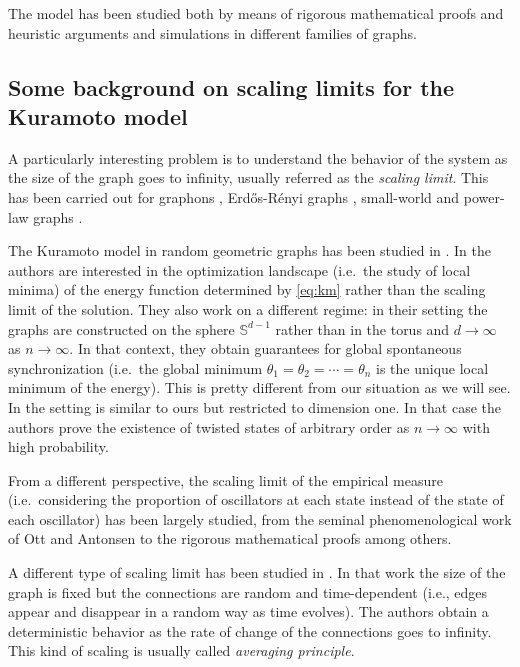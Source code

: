 \documentclass[a4paper,11pt]{amsart}
\numberwithin{equation}{section}
\numberwithin{theorem}{section}
\theoremstyle{definition}
\begin{document}
The model has been studied both by means of rigorous mathematical proofs and heuristic arguments and simulations in different families of graphs.


\subsection{Some background on scaling limits for the Kuramoto model}

A particularly interesting problem is to understand the behavior of the system as the size of the graph goes to infinity, usually referred as the {\em scaling limit}. This has been carried out for graphons \cite{medvedev2018continuum, Medvedev2014, MedvedevWgraphs, MedvedevSmallWorld}, Erd\H{os}-R\'enyi graphs \cite{medvedev2018continuum, ling2019landscape, kassabov2022global}, small-world and power-law graphs \cite{MedvedevSmallWorld, medvedev2018continuum}.

The Kuramoto model in random geometric graphs has been studied in \cite{abdalla2022guarantees,devita2024energy}. In \cite{abdalla2022guarantees} the authors are interested in the optimization landscape (i.e.~the study of local minima) of the energy function determined by \eqref{eq:km} rather than the scaling limit of the solution. They also work on a different regime: in their setting the graphs are constructed on the sphere $\mathbb S^{d-1}$ rather than in the torus and $d\to \infty$ as $n\to \infty$. In that context, they obtain guarantees for global spontaneous synchronization (i.e.~the global minimum $\theta_1=\theta_2 = \cdots = \theta_n$ is the unique local minimum of the energy). This is pretty different from our situation as we will see. In \cite{devita2024energy} the setting is similar to ours but restricted to dimension one. In that case the authors prove the existence of twisted states of arbitrary order as $n\to \infty$ with high probability.

From a different perspective, the scaling limit of the empirical measure (i.e.~considering the proportion of oscillators at each state instead of the state of each oscillator) has been largely studied, from the seminal phenomenological work of Ott and Antonsen \cite{OA1,OA2} to the rigorous mathematical proofs \cite{coppini2020law, coppini2022long, Oliveira1, Oliveira2, Oliveira3} among others.

A different type of scaling limit has been studied in \cite{GHV}. In that work the size of the graph is fixed but the connections are random and time-dependent (i.e., edges appear and disappear in a random way as time evolves). The authors obtain a deterministic behavior as the rate of change of the connections goes to infinity. This kind of scaling is usually called {\em averaging principle}.
\end{document}
